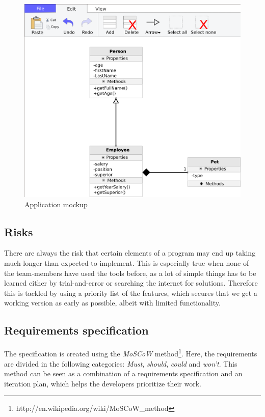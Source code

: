 \begin{figure}[H]
\centering
\includegraphics[width=\linewidth]{img/mockup}
\caption{Application mockup \label{mockup}}
\end{figure}

\subsection{Risks}
There are always the risk that certain elements of a program may end up taking
much longer than expected to implement.
This is especially true when none of the team-members have
used the tools before, as a lot of simple things has to be learned either by
trial-and-error or searching the internet for solutions. Therefore this is
tackled by using a priority list of the features, which secures that we get a
working version as early as possible, albeit with limited functionality. 

\newpage
\subsection{Requirements specification}
The specification is created using the \textit{MoSCoW} 
method\footnote{http://en.wikipedia.org/wiki/MoSCoW\_method}. Here, the 
requirements 
are divided in the following categories: \textit{Must}, \textit{should}, 
\textit{could} and \textit{won't}. This method can be seen as a combination of 
a requirements specification and an iteration plan, which helps the developers 
prioritize their work.

